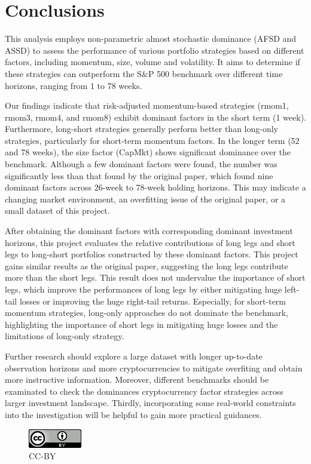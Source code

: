 \documentclass{article}
\begin{document}
\hypertarget{conclusions}{%
\section{Conclusions}\label{conclusions}}

This analysis employs non-parametric almost stochastic dominance (AFSD and ASSD) to assess the performance of various portfolio strategies based on different factors, including momentum, size, volume and volatility. It aims to determine if these strategies can outperform the S\&P 500 benchmark over different time horizons, ranging from 1 to 78 weeks. 

Our findings indicate that risk-adjusted momentum-based strategies (rmom1, rmom3, rmom4, and rmom8) exhibit dominant factors in the short term (1 week). Furthermore, long-short strategies generally perform better than long-only strategies, particularly for short-term momentum factors. In the longer term (52 and 78 weeks), the size factor (CapMkt) shows significant dominance over the benchmark. Although a few dominant factors were found,  the number was significantly less than that found by the original paper, which found nine dominant factors across 26-week to 78-week holding horizons. This may indicate a changing market environment, an overfitting issue of the original paper, or a small dataset of this project.

After obtaining the dominant factors with corresponding dominant investment horizons, this project evaluates the relative contributions of long legs and short legs to long-short portfolios constructed by these dominant factors. This project gains similar results as the original paper, suggesting the long legs contribute more than the short legs. This result does not undervalue the importance of short legs, which improve the performances of long legs by either mitigating huge left-tail losses or improving the huge right-tail returns.  Especially, for short-term momentum strategies, long-only approaches do not dominate the benchmark, highlighting the importance of short legs in mitigating huge losses and the limitations of long-only strategy.

Further research should explore a large dataset with longer up-to-date observation horizons and more cryptocurrencies to mitigate overfiting and obtain more instructive information. Moreover, different benchmarks should be examinated to check the dominances cryptocurrency factor strategies across larger investment landscape. Thirdly, incorporating some real-world constraints into the investigation will be helpful to gain more practical guidances. 


\newpage

\begin{figure}
\centering
\includegraphics{cc_by_88x31.png}
\caption{CC-BY}
\end{figure}

\nocite{*}
\printbibliography[notkeyword=ignore]
\end{document}
